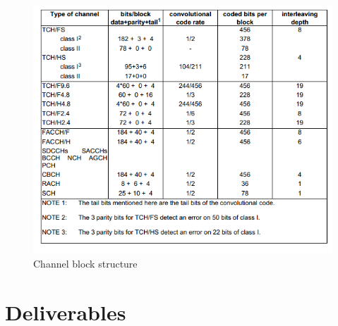 \documentclass[a4paper,12pt,oneside]{article}
\begin{document}
\begin{figure}[h]
\centering\includegraphics[width=5in]{figure/coding.png}
\caption{Channel block structure \label{fig:coding} \cite{etsi199203}}
\end{figure}


\section{Deliverables}
\end{document}
